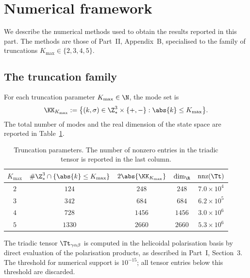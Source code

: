 \section{Numerical framework}
\label{part-5:sec:numerical-framework}

We describe the numerical methods used to obtain the results reported 
in this part. The methods are those of Part~II, Appendix~B, 
specialised to the family of truncations $K_{\max}\in\{2,3,4,5\}$.

\subsection{The truncation family}
\label{part-5:ssec:truncation-family}

For each truncation parameter $K_{\max}\in\N$, the mode set is
\begin{equation}\label{part-5:eq:mode-set-V}
\KK_{K_{\max}} := \bigl\{(k,\sigma)\in\Z^3_\ast\times\{+,-\} : 
\abs{k}\leq K_{\max}\bigr\}.
\end{equation}
The total number of modes and the real dimension of the state space 
are reported in Table~\ref{part-5:tab:truncation-params}.

\begin{table}[h]
\centering
\caption{Truncation parameters. The number of nonzero entries in the 
triadic tensor is reported in the last column.}
\label{part-5:tab:truncation-params}
\begin{tabular}{ccccc}
\toprule
$K_{\max}$ & $\#\Z^3_\ast\cap\{\abs{k}\leq K_{\max}\}$ & 
$2\abs{\KK_{K_{\max}}}$ & $\dim_\R$ & $\operatorname{nnz}(\Tt)$ \\
\midrule
$2$ & $124$ & $248$ & $248$ & $7.0\times 10^4$ \\
$3$ & $342$ & $684$ & $684$ & $6.2\times 10^5$ \\
$4$ & $728$ & $1456$ & $1456$ & $3.0\times 10^6$ \\
$5$ & $1330$ & $2660$ & $2660$ & $5.3\times 10^6$ \\
\bottomrule
\end{tabular}
\end{table}

The triadic tensor $\Tt_{\gamma\alpha\beta}$ is computed in the 
helicoidal polarisation basis by direct evaluation of the polarisation 
products, as described in Part~I, Section~3. The threshold for 
numerical support is $10^{-15}$; all tensor entries below this 
threshold are discarded.

